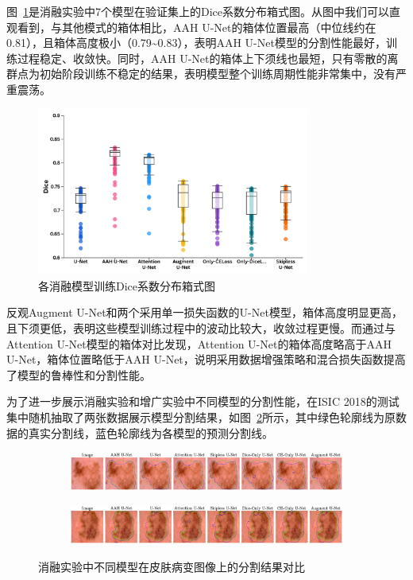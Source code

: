 图~\ref{fig:box_img}是消融实验中7个模型在验证集上的Dice系数分布箱式图。从图中我们可以直观看到，与其他模式的箱体相比，AAH U-Net的箱体位置最高（中位线约在0.81），且箱体高度极小（0.79\textasciitilde0.83），表明AAH U-Net模型的分割性能最好，训练过程稳定、收敛快。同时，AAH U-Net的箱体上下须线也最短，只有零散的离群点为初始阶段训练不稳定的结果，表明模型整个训练周期性能非常集中，没有严重震荡。

\begin{figure}[!htbp]
    \centering
    \includegraphics[width=0.8\textwidth]{fig/box_plot@2x.png}
    \caption{各消融模型训练Dice系数分布箱式图}
    \label{fig:box_img}
\end{figure}

反观Augment U-Net和两个采用单一损失函数的U-Net模型，箱体高度明显更高，且下须更低，表明这些模型训练过程中的波动比较大，收敛过程更慢。而通过与Attention U-Net模型的箱体对比发现，Attention U-Net的箱体高度略高于AAH U-Net，箱体位置略低于AAH U-Net，说明采用数据增强策略和混合损失函数提高了模型的鲁棒性和分割性能。

为了进一步展示消融实验和增广实验中不同模型的分割性能，在ISIC 2018的测试集中随机抽取了两张数据展示模型分割结果，如图~\ref{fig:ablation_results}所示，其中绿色轮廓线为原数据的真实分割线，蓝色轮廓线为各模型的预测分割线。

\begin{figure}[!htbp]
    \centering
    \begin{subfigure}{\linewidth}
        \centering
        \includegraphics[width=\linewidth]{fig/ablation_compare_row1.png}
    \end{subfigure}
    
    \vspace{0.5em}  %

    \begin{subfigure}{\linewidth}
        \centering
        \includegraphics[width=\linewidth]{fig/ablation_compare_row2.png}
    \end{subfigure}

    \caption{消融实验中不同模型在皮肤病变图像上的分割结果对比}
    \label{fig:ablation_results}
\end{figure}

